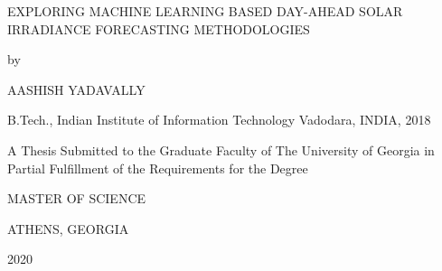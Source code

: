 \thispagestyle{empty}
\begin{center}
    EXPLORING MACHINE LEARNING BASED DAY-AHEAD SOLAR IRRADIANCE FORECASTING METHODOLOGIES
    
    \vspace*{2\baselineskip}
    by

    \vspace*{2\baselineskip}
    AASHISH YADAVALLY
    
    B.Tech., Indian Institute of Information Technology Vadodara, INDIA, 2018
    \vspace*{4\baselineskip}

    A Thesis Submitted to the Graduate Faculty of The University of Georgia
    in Partial Fulfillment of the Requirements for the Degree
    \vspace*{3\baselineskip}

    MASTER OF SCIENCE
    \vspace*{3\baselineskip}

    ATHENS, GEORGIA
    
    2020
\end{center}

\newpage